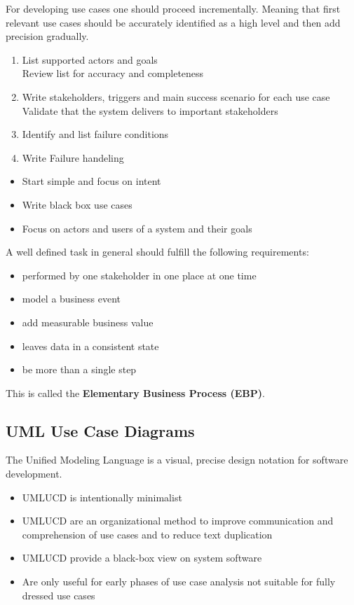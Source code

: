 \documentclass[
../../Software_Engineering_Summary.tex,
]
{subfiles}
\begin{document}
For developing use cases one should proceed incrementally. Meaning that first relevant use cases should be accurately identified as a high level and then add precision gradually.

\begin{greenbox}
    \begin{enumerate}
        \item List supported actors and goals\\ Review list for accuracy and completeness
        \item Write stakeholders, triggers and main success scenario for each use case \\ Validate that the system delivers to important stakeholders
        \item Identify and list failure conditions
        \item Write Failure handeling
    \end{enumerate}
    \begin{itemize}
        \item Start simple and focus on intent
        \item Write black box use cases
        \item Focus on actors and users of a system and their goals
    \end{itemize}
\end{greenbox}

A well defined task in general should fulfill the following requirements:
\begin{itemize}
    \item performed by one stakeholder in one place at one time
    \item model a business event
    \item add measurable business value
    \item leaves data in a consistent state
    \item be more than a single step
\end{itemize}
This is called the \textbf{Elementary Business Process (EBP)}.

\newpage
\subsection{UML Use Case Diagrams}
The Unified Modeling Language is a visual, precise design notation for software development.

\begin{greenbox}
    \begin{itemize}
        \item UMLUCD is intentionally minimalist
        \item UMLUCD are an organizational method to improve communication and comprehension of use cases and to reduce text duplication
        \item UMLUCD provide a black-box view on system software
        \item Are only useful for early phases of use case analysis \rightarrow not suitable for fully dressed use cases
    \end{itemize}
\end{greenbox}
\end{document}
